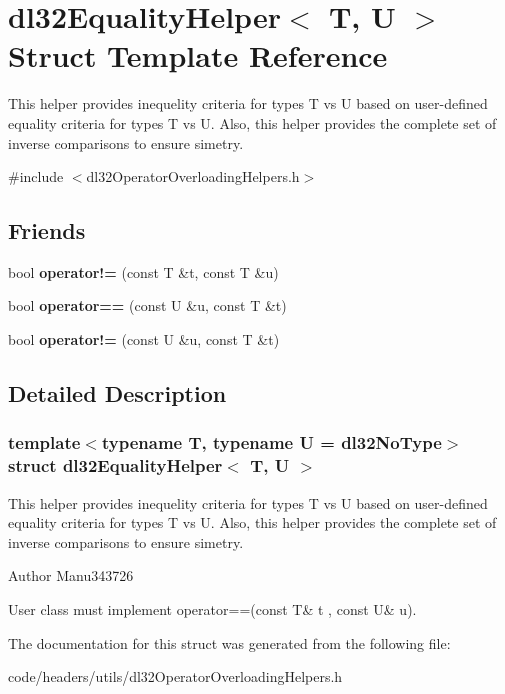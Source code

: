 \hypertarget{structdl32_equality_helper}{\section{dl32\-Equality\-Helper$<$ T, U $>$ Struct Template Reference}
\label{structdl32_equality_helper}
}


This helper provides inequelity criteria for types T vs U based on user-\/defined equality criteria for types T vs U. Also, this helper provides the complete set of inverse comparisons to ensure simetry.  




{\ttfamily \#include $<$dl32\-Operator\-Overloading\-Helpers.\-h$>$}

\subsection*{Friends}
\begin{DoxyCompactItemize}
\item 
\hypertarget{structdl32_equality_helper_a0424e553e4e46a60d2ed65082dbfb56e}{bool {\bfseries operator!=} (const T \&t, const T \&u)}\label{structdl32_equality_helper_a0424e553e4e46a60d2ed65082dbfb56e}

\item 
\hypertarget{structdl32_equality_helper_ae3860afc0733d2babd62f2e5ded138ea}{bool {\bfseries operator==} (const U \&u, const T \&t)}\label{structdl32_equality_helper_ae3860afc0733d2babd62f2e5ded138ea}

\item 
\hypertarget{structdl32_equality_helper_ae02c7f3ee57c16237703ab69dabcdd7a}{bool {\bfseries operator!=} (const U \&u, const T \&t)}\label{structdl32_equality_helper_ae02c7f3ee57c16237703ab69dabcdd7a}

\end{DoxyCompactItemize}


\subsection{Detailed Description}
\subsubsection*{template$<$typename T, typename U = dl32\-No\-Type$>$struct dl32\-Equality\-Helper$<$ T, U $>$}

This helper provides inequelity criteria for types T vs U based on user-\/defined equality criteria for types T vs U. Also, this helper provides the complete set of inverse comparisons to ensure simetry. 

\begin{DoxyAuthor}{Author}
Manu343726
\end{DoxyAuthor}
User class must implement operator==(const T\& t , const U\& u). 

The documentation for this struct was generated from the following file\-:\begin{DoxyCompactItemize}
\item 
code/headers/utils/dl32\-Operator\-Overloading\-Helpers.\-h\end{DoxyCompactItemize}

